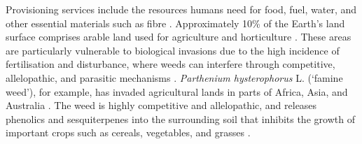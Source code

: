Provisioning services include the resources humans need for food, fuel, water, and other essential materials such as fibre \citep{Pejchar2009,Vila2017}. Approximately 10\% of the Earth's land surface comprises arable land used for agriculture and horticulture \citep{Fried2017}. These areas are particularly vulnerable to biological invasions due to the high incidence of fertilisation and disturbance, where weeds can interfere through competitive, allelopathic, and parasitic mechanisms \citep{Fried2017}. \textit{Parthenium hysterophorus} L. (‘famine weed’), for example, has invaded agricultural lands in parts of Africa, Asia, and Australia \citep{Mcconnachie2011}. The weed is highly competitive and allelopathic, and releases phenolics and sesquiterpenes into the surrounding soil that inhibits the growth of important crops such as cereals, vegetables, and grasses \citep{Evans1997}. \\
